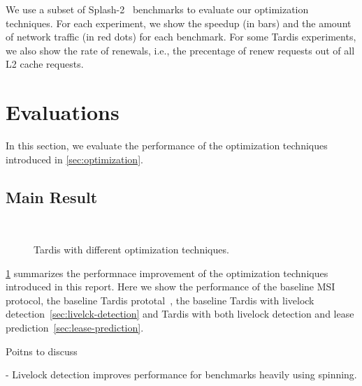 \documentclass[12pt]{article}
\begin{document}
We use a subset of Splash-2~\cite{splash2} benchmarks to evaluate our 
optimization techniques. For each experiment, we show the speedup (in 
bars) and the amount of network traffic (in red dots) for each 
benchmark. For some Tardis experiments, we also show the rate of 
renewals, i.e., the precentage of renew requests out of all L2 cache 
requests.     

\section{Evaluations}

In this section, we evaluate the performance of the optimization 
techniques introduced in \cref{sec:optimization}.

\subsection{Main Result}

\begin{figure}
	\centering
	\\
	\caption{ Tardis with different optimization techniques.}
	\label{fig:main}
\end{figure}

\cref{fig:main} summarizes the performnace improvement of the 
optimization techniques introduced in this report. Here we show the 
performance of the baseline MSI protocol, the baseline Tardis 
prototal~\cite{yu2015}, the baseline Tardis with livelock 
detection~\cref{sec:livelck-detection} and Tardis with both livelock 
detection and lease prediction~\cref{sec:lease-prediction}.

Poitns to discuss

- Livelock detection improves performance for benchmarks heavily using 
  spinning.
\end{document}
